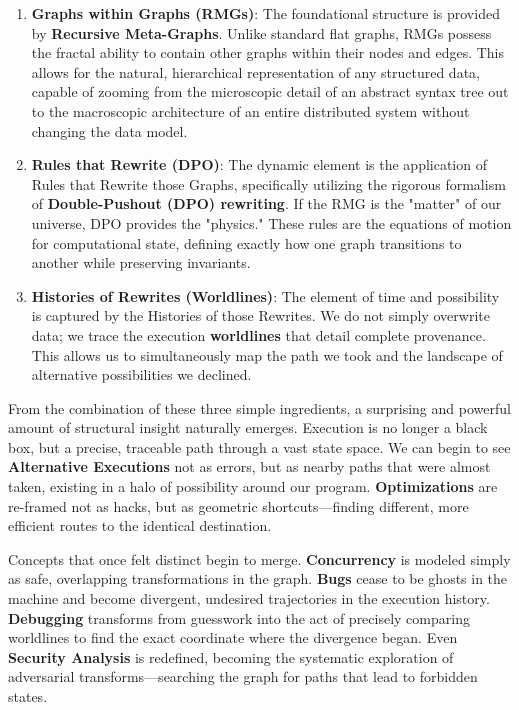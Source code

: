 \begin{enumerate}
    \item \textbf{Graphs within Graphs (RMGs)}: The foundational structure is provided by \textbf{Recursive Meta-Graphs}. Unlike standard flat graphs, RMGs possess the fractal ability to contain other graphs within their nodes and edges. This allows for the natural, hierarchical representation of any structured data, capable of zooming from the microscopic detail of an abstract syntax tree out to the macroscopic architecture of an entire distributed system without changing the data model.
    
    \item \textbf{Rules that Rewrite (DPO)}: The dynamic element is the application of Rules that Rewrite those Graphs, specifically utilizing the rigorous formalism of \textbf{Double-Pushout (DPO) rewriting}. If the RMG is the "matter" of our universe, DPO provides the "physics." These rules are the equations of motion for computational state, defining exactly how one graph transitions to another while preserving invariants.
    
    \item \textbf{Histories of Rewrites (Worldlines)}: The element of time and possibility is captured by the Histories of those Rewrites. We do not simply overwrite data; we trace the execution \textbf{worldlines} that detail complete provenance. This allows us to simultaneously map the path we took and the landscape of alternative possibilities we declined.
\end{enumerate}

From the combination of these three simple ingredients, a surprising and powerful amount of structural insight naturally emerges. Execution is no longer a black box, but a precise, traceable path through a vast state space. We can begin to see \textbf{Alternative Executions} not as errors, but as nearby paths that were almost taken, existing in a halo of possibility around our program. \textbf{Optimizations} are re-framed not as hacks, but as geometric shortcuts—finding different, more efficient routes to the identical destination.

Concepts that once felt distinct begin to merge. \textbf{Concurrency} is modeled simply as safe, overlapping transformations in the graph. \textbf{Bugs} cease to be ghosts in the machine and become divergent, undesired trajectories in the execution history. \textbf{Debugging} transforms from guesswork into the act of precisely comparing worldlines to find the exact coordinate where the divergence began. Even \textbf{Security Analysis} is redefined, becoming the systematic exploration of adversarial transforms—searching the graph for paths that lead to forbidden states.

